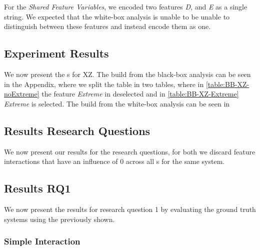 For the \emph{Shared Feature Variables}, we encoded two features \emph{D}, and \emph{E} as a single string. We expected that the white-box analysis is unable
to be unable to distinguish between these features and instead encode them as one.

\subsection{Experiment Results}

We now present the {\perfInfluenceModel}s for \textsc{XZ}. The {\perfInfluenceModel} build from the black-box analysis can be seen
in the Appendix, where we split the table in two tables, where in \autoref{table:BB-XZ-noExtreme} the feature \emph{Extreme} in 
deselected and in \autoref{table:BB-XZ-Extreme} \emph{Extreme} is selected. The {\perfInfluenceModel} build from the white-box analysis 
can be seen in %

\subsection{Results Research Questions}
We now present our results for the research questions, for both we discard feature interactions that have an influence of 0 
across all {\perfInfluenceModel}s for the same system.

\subsection*{Results RQ1}

We now present the results for research question 1 by evaluating the ground truth systems using the {\perfInfluenceModel} previously
shown.

\subsubsection*{Simple Interaction}

